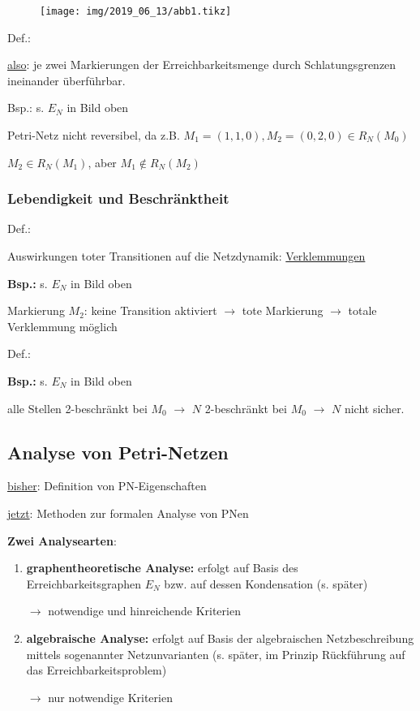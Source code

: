 	\begin{figure}[H]
		\centering
		\texttt{[image: img/2019\_06\_13/abb1.tikz]}
	\end{figure}
	
Def.:  

\underline{also}: je zwei Markierungen der Erreichbarkeitsmenge durch Schlatungsgrenzen ineinander überführbar.

Bsp.: s. $E_N$ in Bild oben

Petri-Netz nicht reversibel, da z.B. $M_1 = (1,1,0), M_2 = (0,2,0) \in R_N(M_0)$

$M_2 \in R_N(M_1)$, aber $M_1\notin R_N(M_2)$ 

\subsubsection{Lebendigkeit und Beschränktheit}
Def.: 

Auswirkungen toter Transitionen auf die Netzdynamik: \underline{Verklemmungen} 

\textbf{Bsp.:} s. $E_N$ in Bild oben

Markierung $M_2$: keine Transition aktiviert $\rightarrow$ tote Markierung $\rightarrow$ totale Verklemmung möglich

Def.: 

\textbf{Bsp.:} s. $E_N$ in Bild oben

alle Stellen 2-beschränkt bei $M_0$ $\rightarrow$ $N$ 2-beschränkt bei $M_0$ $\rightarrow$ $N$ nicht sicher. 

\subsection{Analyse von Petri-Netzen}
\underline{bisher}: Definition von PN-Eigenschaften

\underline{jetzt}: Methoden zur formalen Analyse von PNen

\textbf{Zwei Analysearten}:

\begin{enumerate}
	\item{\textbf{graphentheoretische Analyse:}} erfolgt auf Basis des Erreichbarkeitsgraphen $E_N$ bzw. auf dessen Kondensation (s. später) 
	
	$\rightarrow$ notwendige und hinreichende Kriterien
	
	\item{\textbf{algebraische Analyse:}} erfolgt auf Basis der algebraischen Netzbeschreibung mittels sogenannter Netzunvarianten (s. später, im Prinzip Rückführung auf das Erreichbarkeitsproblem)
	
	$\rightarrow$ nur notwendige Kriterien
\end{enumerate}

